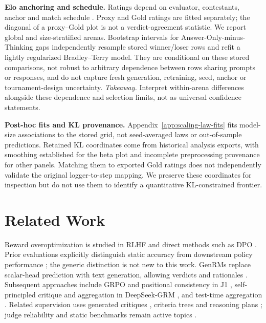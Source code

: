 \documentclass[11pt,letterpaper]{article}
\begin{document}
\textbf{Elo anchoring and schedule.} Ratings depend on evaluator, contestants, anchor and match schedule \citep{chatbot-arena-2024}. Proxy and Gold ratings are fitted separately; the diagonal of a proxy--Gold plot is not a verdict-agreement statistic. We report global and size-stratified arenas. Bootstrap intervals for Answer-Only-minus-Thinking gaps independently resample stored winner/loser rows and refit a lightly regularized Bradley--Terry model. They are conditional on these stored comparisons, not robust to arbitrary dependence between rows sharing prompts or responses, and do not capture fresh generation, retraining, seed, anchor or tournament-design uncertainty. \textit{Takeaway.} Interpret within-arena differences alongside these dependence and selection limits, not as universal confidence statements.

\textbf{Post-hoc fits and KL provenance.} Appendix~\ref{app:scaling-law-fits} fits model-size associations to the stored grid, not seed-averaged laws or out-of-sample predictions. Retained KL coordinates come from historical analysis exports, with smoothing established for the beta plot and incomplete preprocessing provenance for other panels. Matching them to exported Gold ratings does not independently validate the original logger-to-step mapping. We preserve these coordinates for inspection but do not use them to identify a quantitative KL-constrained frontier.

\section{Related Work}

Reward overoptimization is studied in RLHF \citep{ouyang2022training,gao2022scaling} and direct methods such as DPO \citep{rafailov2023dpo,rafailov2024rewardoveropt}. Prior evaluations explicitly distinguish static accuracy from downstream policy performance \citep{wen2025rethinking,frick2024evaluate,kim2025rethinking}; the generic distinction is not new to this work. GenRMs replace scalar-head prediction with text generation, allowing verdicts and rationales \citep{mahan2024generative,zhang2024genverifier}. Subsequent approaches include GRPO and positional consistency in J1 \citep{whitehouse2025j1}, self-principled critique and aggregation in DeepSeek-GRM \citep{liu2025inferencegrm}, and test-time aggregation \citep{wang2025helpsteer3,shi2025heimdall}. Related supervision uses generated critiques \citep{yu2025criticrm}, criteria trees \citep{liang2025syncpl} and reasoning plans \citep{saha2025evalplanner}; judge reliability and static benchmarks remain active topics \citep{ye2024llmasjudge,lambert2024rewardbench}.
\end{document}
